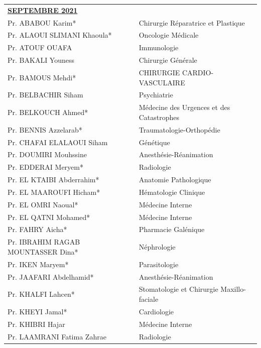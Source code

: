 \begin{table}[H]
  \begin{tabular}{l l}
    \multicolumn{2}{l}{\textbf{\underline{SEPTEMBRE 2021}}}\vspace*{0.5em}\\
    Pr. ABABOU Karim* & Chirurgie Réparatrice et Plastique \\
    Pr. ALAOUI SLIMANI Khaoula* & Oncologie Médicale \\
    Pr. ATOUF OUAFA & Immunologie \\
    Pr. BAKALI Youness & Chirurgie Générale \\
    Pr. BAMOUS Mehdi* & CHIRURGIE CARDIO-VASCULAIRE \\
    Pr. BELBACHIR Siham & Psychiatrie \\
    Pr. BELKOUCH Ahmed* & Médecine des Urgences et des Catastrophes \\
    Pr. BENNIS Azzelarab* & Traumatologie-Orthopédie \\
    Pr. CHAFAI ELALAOUI Siham & Génétique \\
    Pr. DOUMIRI Mouhssine & Anesthésie-Réanimation \\
    Pr. EDDERAI Meryem* & Radiologie \\
    Pr. EL KTAIBI Abderrahim* & Anatomie Pathologique \\
    Pr. EL MAAROUFI Hicham* & Hématologie Clinique \\
    Pr. EL OMRI Naoual* & Médecine Interne \\
    Pr. EL QATNI Mohamed* & Médecine Interne \\
    Pr. FAHRY Aicha* & Pharmacie Galénique \\
    Pr. IBRAHIM RAGAB MOUNTASSER Dina* & Néphrologie \\
    Pr. IKEN Maryem* & Parasitologie \\
    Pr. JAAFARI Abdelhamid* & Anesthésie-Réanimation \\
    Pr. KHALFI Lahcen* & Stomatologie et Chirurgie Maxillo-faciale \\
    Pr. KHEYI Jamal* & Cardiologie \\
    Pr. KHIBRI Hajar & Médecine Interne \\
    Pr. LAAMRANI Fatima Zahrae & Radiologie \\
   
  \end{tabular}
\end{table}

